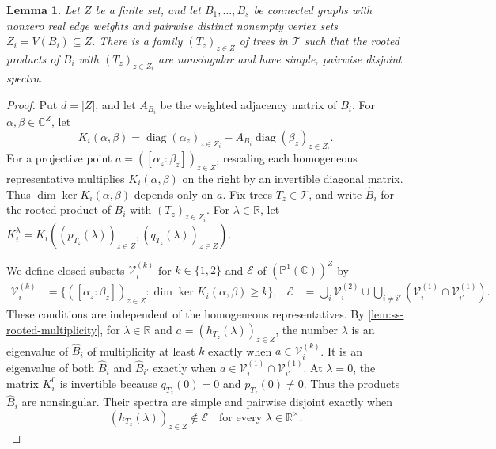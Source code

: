 \documentclass[10pt,a4paper]{article}
\theoremstyle{plain}
\newtheorem{lemma}[theorem]{Lemma}
\theoremstyle{definition}
\DeclareMathOperator{\diag}{diag}
\newcommand{\R}{\mathbb{R}}
\begin{document}
\begin{lemma}\label{lem:ss-separation}
Let $Z$ be a finite set, and let $B_1,\ldots,B_s$ be connected graphs
with nonzero real edge weights and pairwise distinct nonempty vertex sets
$Z_i=V(B_i)\subseteq Z$.
There is a family $(T_z)_{z\in Z}$ of trees in $\mathcal T$ such that the rooted products
of $B_i$ with $(T_z)_{z\in Z_i}$ are nonsingular and have simple, pairwise
disjoint spectra.
\end{lemma}
\begin{proof}
Put $d=|Z|$, and let $A_{B_i}$ be the weighted adjacency matrix of $B_i$.
For $\alpha,\beta\in\mathbb C^Z$, let
\begin{equation}\label{eq:ss-core}
 K_i(\alpha,\beta)=\diag(\alpha_z)_{z\in Z_i}-A_{B_i}\diag(\beta_z)_{z\in Z_i}.
\end{equation}
For a projective point $a=([\alpha_z:\beta_z])_{z\in Z}$,
rescaling each homogeneous representative multiplies $K_i(\alpha,\beta)$
on the right by an invertible diagonal matrix.
Thus $\dim\ker K_i(\alpha,\beta)$ depends only on $a$.
Fix trees $T_z\in\mathcal T$, and write $\widehat B_i$ for the rooted
product of $B_i$ with $(T_z)_{z\in Z_i}$.
For $\lambda\in\R$, let
$K_i^\lambda=K_i((p_{T_z}(\lambda))_{z\in Z},(q_{T_z}(\lambda))_{z\in Z})$.

We define closed subsets $\mathcal V_i^{(k)}$ for $k\in\{1,2\}$
and $\mathcal E$ of $(\mathbb P^1(\mathbb C))^Z$ by
\begin{equation}\label{eq:ss-bad-sets}
 \begin{aligned}
 \mathcal V_i^{(k)}&=\{([\alpha_z:\beta_z])_{z\in Z}:\dim\ker K_i(\alpha,\beta)\ge k\}, &
 \mathcal E&=\bigcup_i\mathcal V_i^{(2)}
       \cup\bigcup_{i\ne i'}(\mathcal V_i^{(1)}\cap \mathcal V_{i'}^{(1)}).
 \end{aligned}
\end{equation}
These conditions are independent of the homogeneous representatives.
By \cref{lem:ss-rooted-multiplicity}, for $\lambda\in\R$ and
$a=(h_{T_z}(\lambda))_{z\in Z}$, the number $\lambda$ is an eigenvalue
of $\widehat B_i$ of multiplicity at least $k$ exactly when
$a\in\mathcal V_i^{(k)}$.
It is an eigenvalue of both $\widehat B_i$ and $\widehat B_{i'}$ exactly
when $a\in\mathcal V_i^{(1)}\cap\mathcal V_{i'}^{(1)}$.
At $\lambda=0$, the matrix $K_i^0$ is invertible
because $q_{T_z}(0)=0$ and $p_{T_z}(0)\ne0$.
Thus the products $\widehat B_i$ are nonsingular.
Their spectra are simple and pairwise disjoint exactly when
\begin{equation}\label{eq:ss-bad}
 (h_{T_z}(\lambda))_{z\in Z}\notin\mathcal E
 \quad\text{for every }\lambda\in\R^\times.
\end{equation}


\end{proof}
\end{document}
